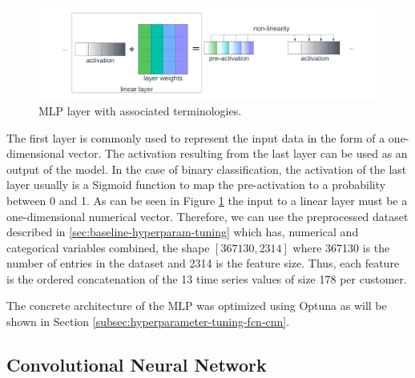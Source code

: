 \documentclass[runningheads]{llncs}
\begin{document}
\begin{figure}[h]
    \includegraphics[width=\textwidth]{images/layer_mlp.pdf}
    \caption{MLP layer with associated terminologies.}
    \label{fig:layer_mlp}
\end{figure}

The first layer is commonly used to represent the input data in the form of a one-dimensional vector. The activation resulting from the last layer can be used as an output of the model. In the case of binary classification, the activation of the last layer usually is a Sigmoid function to map the pre-activation to a probability between 0 and 1.
As can be seen in Figure \ref{fig:layer_mlp} the input to a linear layer must be a one-dimensional numerical vector. Therefore, we can use the preprocessed dataset described in \ref{sec:baseline-hyperparam-tuning} which has, numerical and categorical variables combined, the shape $[367130, 2314]$ where 367130 is the number of entries in the dataset and 2314 is the feature size. Thus, each feature is the ordered concatenation of the 13 time series values of size 178 per customer.

The concrete architecture of the MLP was optimized using Optuna as will be shown in Section \ref{subsec:hyperparameter-tuning-fcn-cnn}.


\subsection{Convolutional Neural Network}

\label{subsec:cnn}
\end{document}
